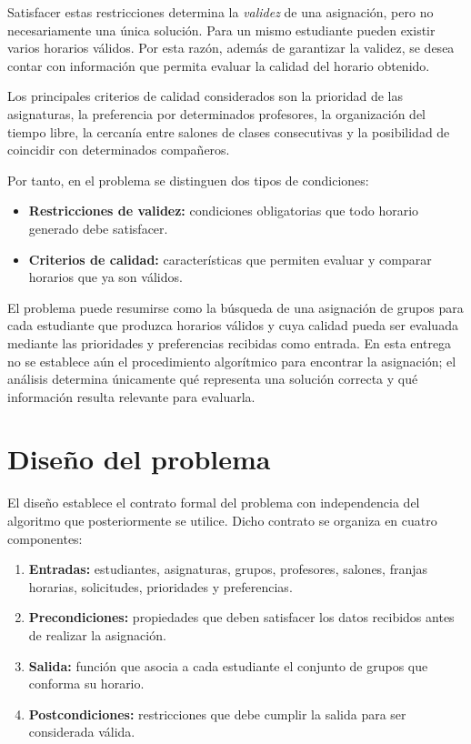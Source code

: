 \documentclass[11pt]{article}
\numberwithin{equation}{section}
\numberwithin{figure}{section}
\numberwithin{table}{section}
\theoremstyle{definition}
\begin{document}
Satisfacer estas restricciones determina la \emph{validez} de una asignación,
pero no necesariamente una única solución. Para un mismo estudiante pueden
existir varios horarios válidos. Por esta razón, además de garantizar la
validez, se desea contar con información que permita evaluar la calidad del
horario obtenido.

Los principales criterios de calidad considerados son la prioridad de las
asignaturas, la preferencia por determinados profesores, la organización del
tiempo libre, la cercanía entre salones de clases consecutivas y la posibilidad
de coincidir con determinados compañeros.

Por tanto, en el problema se distinguen dos tipos de condiciones:

\begin{itemize}
  \item \textbf{Restricciones de validez:} condiciones obligatorias que todo
        horario generado debe satisfacer.
  \item \textbf{Criterios de calidad:} características que permiten evaluar y
        comparar horarios que ya son válidos.
\end{itemize}

El problema puede resumirse como la búsqueda de una asignación de grupos para
cada estudiante que produzca horarios válidos y cuya calidad pueda ser
evaluada mediante las prioridades y preferencias recibidas como entrada. En
esta entrega no se establece aún el procedimiento algorítmico para encontrar
la asignación; el análisis determina únicamente qué representa una solución
correcta y qué información resulta relevante para evaluarla.

\section{Diseño del problema}

El diseño establece el contrato formal del problema con independencia del
algoritmo que posteriormente se utilice. Dicho contrato se organiza en cuatro
componentes:

\begin{enumerate}
  \item \textbf{Entradas:} estudiantes, asignaturas, grupos, profesores,
        salones, franjas horarias, solicitudes, prioridades y preferencias.
  \item \textbf{Precondiciones:} propiedades que deben satisfacer los datos
        recibidos antes de realizar la asignación.
  \item \textbf{Salida:} función que asocia a cada estudiante el conjunto de
        grupos que conforma su horario.
  \item \textbf{Postcondiciones:} restricciones que debe cumplir la salida
        para ser considerada válida.
\end{enumerate}
\end{document}
